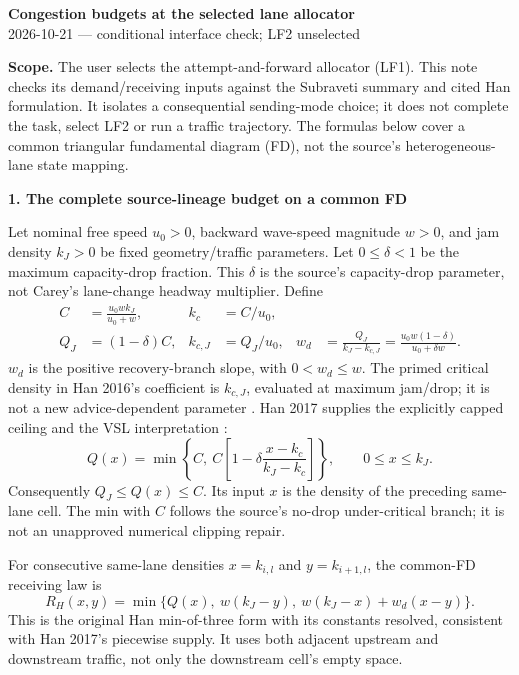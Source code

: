 \documentclass[10pt,a4paper]{article}
\newcommand{\head}[1]{\par\medskip\textbf{#1}\par}
\begin{document}
\begin{center}
{\large\bfseries Congestion budgets at the selected lane allocator}\\[3pt]
2026-10-21 --- conditional interface check; LF2 unselected
\end{center}

\textbf{Scope.} The user selects the attempt-and-forward allocator (LF1).
This note checks its demand/receiving inputs against the Subraveti summary
and cited Han formulation. It isolates a consequential sending-mode choice;
it does not complete the task, select LF2 or run a traffic trajectory.
The formulas below cover a common triangular fundamental diagram (FD), not
the source's heterogeneous-lane state mapping.

\head{1. The complete source-lineage budget on a common FD}
Let nominal free speed $u_0>0$, backward wave-speed magnitude $w>0$, and jam
density $k_J>0$ be fixed geometry/traffic parameters. Let $0\leq\delta<1$ be
the maximum capacity-drop fraction. This $\delta$ is the source's capacity-drop
parameter, not Carey's lane-change headway multiplier. Define
\begin{align}
 C&=\frac{u_0wk_J}{u_0+w}, & k_c&=C/u_0,\nonumber\\
 Q_J&=(1-\delta)C, & k_{c,J}&=Q_J/u_0, &
 w_d&=\frac{Q_J}{k_J-k_{c,J}}
      =\frac{u_0w(1-\delta)}{u_0+\delta w}. \label{eq:fixed}
\end{align}
$w_d$ is the positive recovery-branch slope, with $0<w_d\leq w$.
The primed critical density in Han 2016's coefficient is $k_{c,J}$, evaluated
at maximum jam/drop; it is not a new advice-dependent parameter
\cite[sec. 3.2, eqs. (3)--(7)]{han16}. Han 2017 supplies the explicitly
capped ceiling and the VSL interpretation \cite[sec. 2.3]{han17}:
\begin{equation}
 Q(x)=\min\left\{C,\ C\left[1-\delta\frac{x-k_c}{k_J-k_c}\right]\right\},
 \qquad 0\leq x\leq k_J. \label{eq:ceiling}
\end{equation}
Consequently $Q_J\leq Q(x)\leq C$. Its input $x$ is the density of the
preceding same-lane cell. The min with $C$ follows the source's no-drop
under-critical branch; it is not an unapproved numerical clipping repair.

For consecutive same-lane densities $x=k_{i,l}$ and $y=k_{i+1,l}$, the
common-FD receiving law is
\begin{equation}
 R_H(x,y)=\min\{Q(x),\ w(k_J-y),\ w(k_J-x)+w_d(x-y)\}. \label{eq:receive}
\end{equation}
This is the original Han min-of-three form with its constants resolved,
consistent with Han 2017's piecewise supply. It uses both adjacent upstream
and downstream traffic, not only the downstream cell's empty space.
\end{document}
